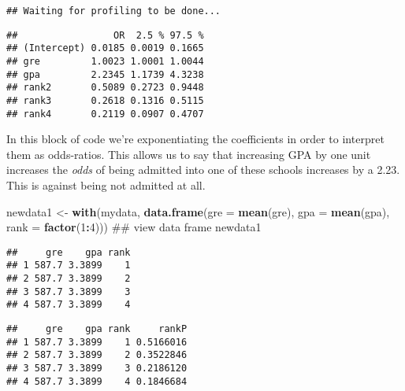 \documentclass[]{article}
\newenvironment{Shaded}{\begin{snugshade}}{\end{snugshade}}
\newcommand{\KeywordTok}[1]{\textcolor[rgb]{0.13,0.29,0.53}{\textbf{#1}}}
\newcommand{\DataTypeTok}[1]{\textcolor[rgb]{0.13,0.29,0.53}{#1}}
\newcommand{\DecValTok}[1]{\textcolor[rgb]{0.00,0.00,0.81}{#1}}
\newcommand{\StringTok}[1]{\textcolor[rgb]{0.31,0.60,0.02}{#1}}
\newcommand{\OperatorTok}[1]{\textcolor[rgb]{0.81,0.36,0.00}{\textbf{#1}}}
\newcommand{\NormalTok}[1]{#1}
\begin{document}
\begin{verbatim}
## Waiting for profiling to be done...
\end{verbatim}

\begin{verbatim}
##                 OR  2.5 % 97.5 %
## (Intercept) 0.0185 0.0019 0.1665
## gre         1.0023 1.0001 1.0044
## gpa         2.2345 1.1739 4.3238
## rank2       0.5089 0.2723 0.9448
## rank3       0.2618 0.1316 0.5115
## rank4       0.2119 0.0907 0.4707
\end{verbatim}

In this block of code we're exponentiating the coefficients in order to
interpret them as odds-ratios. This allows us to say that increasing GPA
by one unit increases the \emph{odds} of being admitted into one of
these schools increases by a 2.23. This is against being not admitted at
all.

\begin{Shaded}
\begin{Highlighting}[]
\NormalTok{newdata1 <-}\StringTok{ }\KeywordTok{with}\NormalTok{(mydata, }
                 \KeywordTok{data.frame}\NormalTok{(}\DataTypeTok{gre =} \KeywordTok{mean}\NormalTok{(gre), }
                            \DataTypeTok{gpa =} \KeywordTok{mean}\NormalTok{(gpa), }
                            \DataTypeTok{rank =} \KeywordTok{factor}\NormalTok{(}\DecValTok{1}\OperatorTok{:}\DecValTok{4}\NormalTok{))) }
\NormalTok{## view data frame }
\NormalTok{newdata1}
\end{Highlighting}
\end{Shaded}

\begin{verbatim}
##     gre    gpa rank
## 1 587.7 3.3899    1
## 2 587.7 3.3899    2
## 3 587.7 3.3899    3
## 4 587.7 3.3899    4
\end{verbatim}

\begin{Shaded}
\end{Shaded}

\begin{verbatim}
##     gre    gpa rank     rankP
## 1 587.7 3.3899    1 0.5166016
## 2 587.7 3.3899    2 0.3522846
## 3 587.7 3.3899    3 0.2186120
## 4 587.7 3.3899    4 0.1846684
\end{verbatim}
\end{document}
